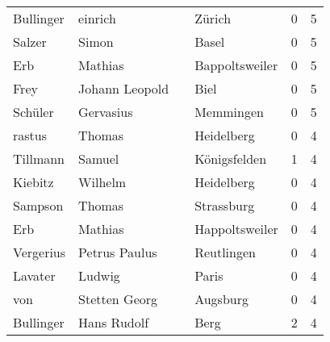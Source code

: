 \documentclass[10pt,a4paper,landscape]{article}
\begin{document}
\begin{longtable}{llllrr}
                Bullinger &                            einrich &             &                                      Zürich &          0 &         5 \\
                   Salzer &                              Simon &             &                                       Basel &          0 &         5 \\
                      Erb &                            Mathias &             &                              Bappoltsweiler &          0 &         5 \\
                     Frey &                     Johann Leopold &             &                                        Biel &          0 &         5 \\
                  Schüler &                          Gervasius &             &                                   Memmingen &          0 &         5 \\
                   rastus &                             Thomas &             &                                  Heidelberg &          0 &         4 \\
                 Tillmann &                             Samuel &             &                                Königsfelden &          1 &         4 \\
                  Kiebitz &                            Wilhelm &             &                                  Heidelberg &          0 &         4 \\
                  Sampson &                             Thomas &             &                                  Strassburg &          0 &         4 \\
                      Erb &                            Mathias &             &                              Happoltsweiler &          0 &         4 \\
                Vergerius &                      Petrus Paulus &             &                                  Reutlingen &          0 &         4 \\
                  Lavater &                             Ludwig &             &                                       Paris &          0 &         4 \\
                      von &                      Stetten Georg &             &                                    Augsburg &          0 &         4 \\
                Bullinger &                        Hans Rudolf &             &                                        Berg &          2 &         4 \\

\end{longtable}
\end{document}
